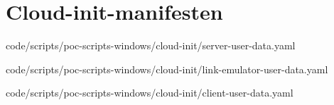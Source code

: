 \section{Cloud-init-manifesten}%
\label{sec:app-cloudinit}


  {code/scripts/poc-scripts-windows/cloud-init/server-user-data.yaml}

  {code/scripts/poc-scripts-windows/cloud-init/link-emulator-user-data.yaml}

  {code/scripts/poc-scripts-windows/cloud-init/client-user-data.yaml}